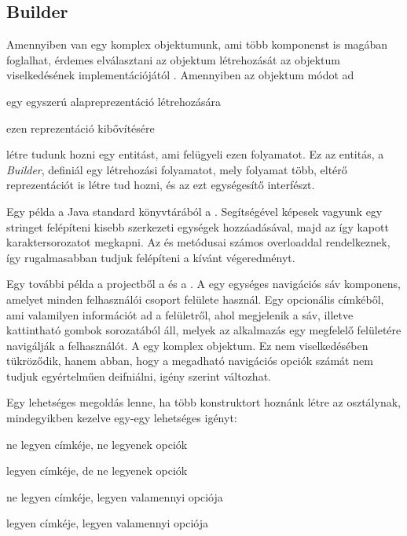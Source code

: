 \subsection{Builder}

Amennyiben van egy komplex objektumunk, ami több komponenst is magában foglalhat, érdemes elválasztani az objektum létrehozását az objektum viselkedésének implementációjától \cite{gamma1995elements} . Amennyiben az objektum módot ad 

\begin{listing}
	\item egy egyszerú alapreprezentáció létrehozására
	\item ezen reprezentáció kibővítésére
\end{listing}

létre tudunk hozni egy entitást, ami felügyeli ezen folyamatot. Ez az entitás, a \emph{Builder}, definiál egy létrehozási folyamatot, mely folyamat több, eltérő reprezentációt is létre tud hozni, és az ezt egységesítő interfészt. \par

Egy példa a Java standard könyvtárából a . Segítségével képesek vagyunk egy stringet felépíteni kisebb szerkezeti egységek hozzáadásával, majd az így kapott karaktersorozatot megkapni. Az  és  metódusai számos overloaddal rendelkeznek, így rugalmasabban tudjuk felépíteni a kívánt végeredményt. \par

Egy további példa a projectből a  és a . A  egy egységes navigációs sáv komponens, amelyet minden felhasználói csoport felülete használ. Egy opcionális címkéből, ami valamilyen információt ad a felületről, ahol megjelenik a sáv, illetve kattintható gombok sorozatából áll, melyek az alkalmazás egy megfelelő felületére navigálják a felhasználót. A  egy komplex objektum. Ez nem viselkedésében tükröződik, hanem abban, hogy a megadható navigációs opciók számát nem tudjuk egyértelműen deifniálni, igény szerint változhat.\par

Egy lehetséges megoldás lenne, ha több konstruktort hoznánk létre az osztálynak, mindegyikben kezelve egy-egy lehetséges igényt: \par

\begin{listing}
	\item ne legyen címkéje, ne legyenek opciók
	\item legyen címkéje, de ne legyenek opciók
	\item ne legyen címkéje, legyen valamennyi opciója
	\item legyen címkéje, legyen valamennyi opciója
\end{listing} \par

